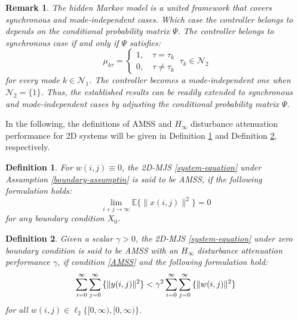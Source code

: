 \documentclass[conference]{IEEEtran}
\newtheorem{remark}{Remark}
\newtheorem{definition}{Definition}
\begin{document}
\begin{remark}
	The hidden Markov model is a united framework that covers synchronous and mode-independent cases. Which case the controller belongs to depends on the conditional probability matrix $\varPsi$.  The controller belongs to synchronous case if and only if $\varPsi$ satisfies:
	\begin{equation*}
	\mu_{k\tau }=
	\begin{cases}
	1, \quad \tau=\tau_{k}\\
	0, \quad \tau\neq \tau_{k}
	\end{cases}\ \tau_{k}\in\mathcal{N}_{2}
	\end{equation*}
	for every mode $k\in\mathcal{N}_{1}$. The controller becomes a mode-independent one when $\mathcal{N}_{2}=\{1\}$. Thus, the established results  can be readily extended to synchronous and mode-independent cases  by adjusting the conditional probability matrix $\varPsi$.
\end{remark}
	
	In the following, the definitions of  AMSS and $H_{\infty}$ disturbance attenuation performance for 2D systems will be given in Definition \ref{mean-square-stable} and Definition \ref{H_infty-performance}, respectively.
	
	\begin{definition}\label{mean-square-stable}
	For $w(i,j)\equiv0$, the 2D-MJS \eqref{system-equation} under Assumption \ref{boundary-assumptin} is said to be AMSS,  if the following formulation holds:
	\begin{equation}\label{AMSS}
			\lim\limits_{i+j\to\infty}\mathbb{E}\{\|x(i,j)\|^{2}\} = 0
	\end{equation}
	for any boundary condition $X_{0}$.
	\end{definition}


	\begin{definition}\label{H_infty-performance}
		Given a scalar $\gamma>0$, the 2D-MJS \eqref{system-equation} under zero boundary condition is said to be AMSS with an $H_{\infty}$ disturbance attenuation performance $\gamma$, if condition \eqref{AMSS} and the following formulation hold:
		\begin{equation} \label{invDef2}
			\sum_{i=0}^{\infty}\sum_{j=0}^{\infty}\mathbb\{\|y(i,j)\|^{2}\} <  \gamma^{2} \sum_{i=0}^{\infty}\sum_{j=0}^{\infty}\mathbb\{\|w(i,j)\|^{2}\}
		\end{equation}
		for all $w(i,j)\in\ell_{2}\{[0,\infty),[0,\infty)\}$.
	\end{definition}
	
\end{document}
